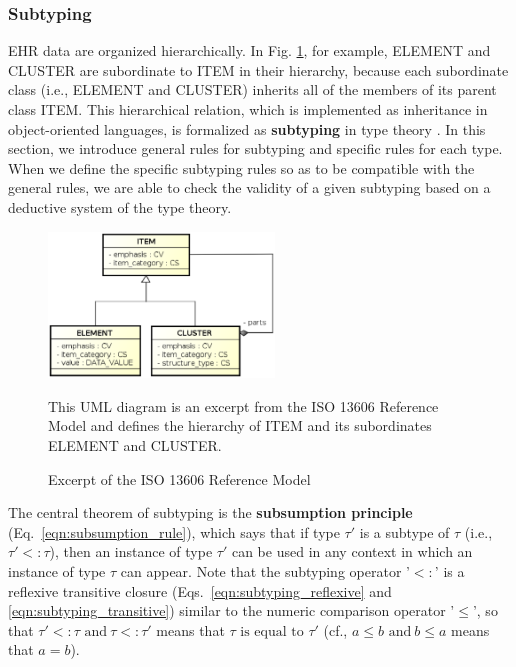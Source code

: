 \documentclass[preprint,3p,onecolumn,times,review]{article}
\begin{document}
{\begin{enumerate}
\end{enumerate}


\subsubsection{Subtyping}

EHR data are organized hierarchically.
In Fig. \ref{fig:excerpt_reference_model}, for example, {\sf ELEMENT} and {\sf CLUSTER} are subordinate to {\sf ITEM} in their hierarchy, because each subordinate class (i.e., {\sf ELEMENT} and {\sf CLUSTER}) inherits all of the members of its parent class {\sf ITEM}.
This hierarchical relation, which is implemented as inheritance in object-oriented languages, is formalized as {\bf subtyping} in type theory \cite[p.85]{craig07:_objec_orien_progr_languag}.
In this section, we introduce general rules for subtyping and specific rules for each type.
When we define the specific subtyping rules so as to be compatible with the general rules, we are able to check the validity of a given subtyping based on a deductive system of the type theory.

\begin{figure}[!htbp]
  \begin{center}
    \includegraphics[width=6cm]{excerpt_reference_model.eps}  
  \end{center}
  \caption{Excerpt of the ISO 13606 Reference Model}\label{fig:excerpt_reference_model}
  {\footnotesize
    This UML diagram is an excerpt from the ISO 13606 Reference Model \cite[p.10]{iso08:13606_healt_elect_part1} and defines the hierarchy of {\sf ITEM} and its subordinates {\sf ELEMENT} and {\sf CLUSTER}.
    }
\end{figure}

The central theorem of subtyping is the {\bf subsumption principle} (Eq.~\ref{eqn:subsumption_rule}), which says that if type $\tau'$ is a subtype of $\tau$ (i.e., $\tau' <: \tau$), then an instance of type $\tau'$ can be used in any context in which an instance of type $\tau$ can appear.
Note that the subtyping operator '$<:$' is a reflexive transitive closure (Eqs.~\ref{eqn:subtyping_reflexive} and \ref{eqn:subtyping_transitive}) similar to the numeric comparison operator '$\leq$', so that  $\tau' <: \tau \text{ and}~ \tau <: \tau' $ means that $\tau \text{ is equal to } \tau'$ (cf., $a \leq b \text{ and}~ b \leq a $ means that $a = b$).

}
\end{document}
